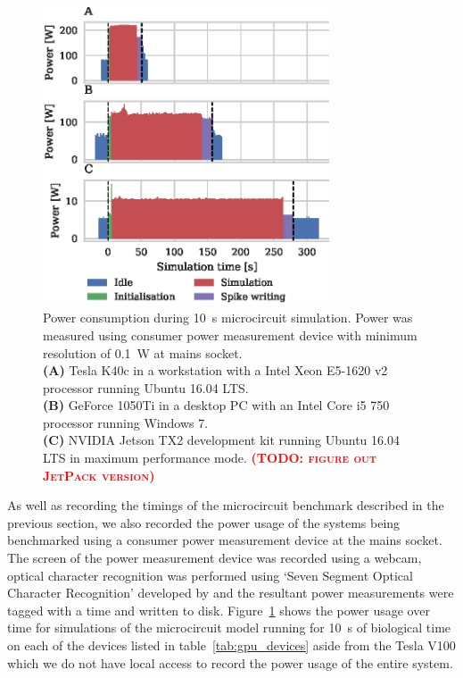 \documentclass[utf8]{frontiersSCNS} %
\newcommand{\todo}[1]{\textbf{\textsc{\textcolor{red}{(TODO: #1)}}}}
\begin{document}
\begin{figure}
    \begin{center}
        \includegraphics[width=85mm]{figures/microcircuit_power}
    \end{center}
    \caption{Power consumption during \SI{10}{\second} microcircuit simulation.
    Power was measured using consumer power measurement device with minimum resolution of \SI{0.1}{\watt} at mains socket.\\
    \textbf{(A)} Tesla K40c in a workstation with a Intel Xeon E5-1620 v2 processor running Ubuntu 16.04 LTS.\\
    \textbf{(B)} GeForce 1050Ti in a desktop PC with an Intel Core i5 750 processor running Windows 7.\\
    \textbf{(C)} NVIDIA Jetson TX2 development kit running Ubuntu 16.04 LTS in maximum performance mode. \todo{figure out JetPack version}}
    \label{fig:microcircuit_power}
\end{figure}

As well as recording the timings of the microcircuit benchmark described in the previous section, we also recorded the power usage of the systems being benchmarked using a consumer power measurement device at the mains socket.
The screen of the power measurement device was recorded using a webcam, optical character recognition was performed using `Seven Segment Optical Character Recognition' developed by \citet{Auerswald2018} and the resultant power measurements were tagged with a time and written to disk.
Figure~\ref{fig:microcircuit_power} shows the power usage over time for simulations of the microcircuit model running for \SI{10}{\second} of biological time on each of the devices listed in table~\ref{tab:gpu_devices} aside from the Tesla V100 which we do not have local access to record the power usage of the entire system.
\end{document}
